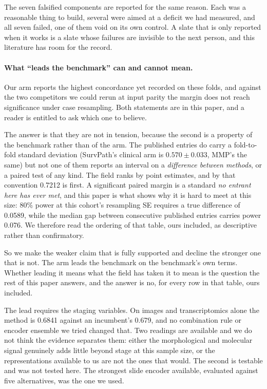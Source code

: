 \documentclass[11pt]{article}
\begin{document}
The seven falsified components are reported for the same reason. Each was a reasonable thing to
build, several were aimed at a deficit we had measured, and all seven failed, one of them void on
its own control. A slate that is only reported when it works is a slate whose failures are
invisible to the next person, and this literature has room for the record.

\paragraph{What ``leads the benchmark'' can and cannot mean.} Our arm reports the highest
concordance yet recorded on these folds, and against the two competitors we could rerun at input
parity the margin does not reach significance under case resampling. Both statements are in this
paper, and a reader is entitled to ask which one to believe.

The answer is that they are not in tension, because the second is a property of the benchmark rather
than of the arm. The published entries do carry a fold-to-fold standard deviation (SurvPath's clinical arm is $0.570\pm0.033$, MMP's the same) but not one of them reports an interval on a
\emph{difference between methods}, or a paired test of any kind. The field ranks by point
estimates, and by that convention 0.7212 is first. A
significant paired margin is a standard \emph{no entrant here has ever met}, and this paper is
what shows why it is hard to meet at this size: 80\% power at this cohort's resampling SE requires a true
difference of 0.0589, while the median gap between consecutive published entries carries power
0.076. We therefore read the ordering of that table, ours included, as descriptive rather than
confirmatory.

So we make the weaker claim that is fully supported and decline the stronger one that is not. The
arm leads the benchmark on the benchmark's own terms. Whether leading it means what the field has
taken it to mean is the question the rest of this paper answers, and the answer is no, for every row in that table, ours included.

The lead requires the staging variables. On images and
transcriptomics alone the method is 0.6841 against an incumbent's 0.679, and no combination rule or
encoder ensemble we tried changed that. Two readings are available and we do not think the evidence
separates them: either the morphological and molecular signal genuinely adds little beyond stage at
this sample size, or the representations available to us are not the ones that would. The second is testable and was not tested here. The strongest slide encoder available, evaluated against
five alternatives, was the one we used.
\end{document}
